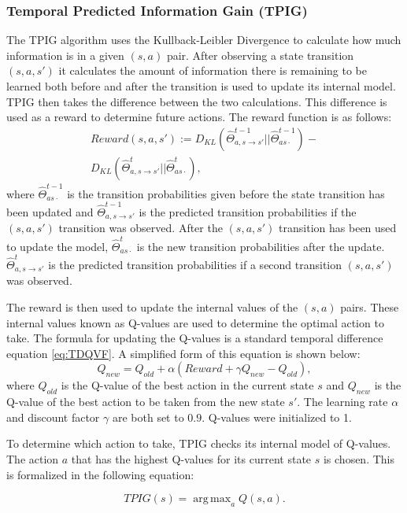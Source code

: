 \documentclass[letterpaper]{article} %
\DeclareMathOperator*{\argmax}{arg\,max}
\begin{document}
\subsubsection{Temporal Predicted Information Gain (TPIG)}
The TPIG algorithm uses the Kullback-Leibler Divergence to calculate how much information is in a given $(s,a)$ pair. After observing a state transition $(s,a,s')$ it calculates the amount of information there is remaining to be learned both before and after the transition is used to update its internal model. TPIG then takes the difference between the two calculations. This difference is used as a reward to determine future actions. The reward function is as follows:
\begin{multline}
	Reward(s,a,s') := D_{KL}(\hat{\Theta}_{a,s \rightarrow s'}^{t-1} || \hat{\Theta}_{as\cdot}^{t-1}) - \\ D_{KL}(\hat{\Theta}_{a,s \rightarrow s'}^{t} || \hat{\Theta}_{as\cdot}^{t}),
\label{eq:TPIGReward}
\end{multline}
where $\hat{\Theta}_{as\cdot}^{t-1}$ is the transition probabilities given before the state transition has been updated and $\hat{\Theta}_{a,s \rightarrow s'}^{t-1}$ is the predicted transition probabilities if the $(s,a,s')$ transition was observed. After the $(s,a,s')$ transition has been used to update the model, $\hat{\Theta}_{as\cdot}^{t}$ is the new transition probabilities after the update. $\hat{\Theta}_{a,s \rightarrow s'}^{t}$ is the predicted transition probabilities if a second transition $(s,a,s')$ was observed.

The reward is then used to update the internal values of the $(s,a)$ pairs. These internal values known as Q-values are used to determine the optimal action to take.
The formula for updating the Q-values is a standard temporal difference equation \eqref{eq:TDQVF}. A simplified form of this equation is shown below:
\[Q_{new} = Q_{old} + \alpha(Reward + \gamma Q_{new} - Q_{old}),\]
where $Q_{old}$ is the Q-value of the best action in the current state $s$ and $Q_{new}$ is the Q-value of the best action to be taken from the new state $s'$. The learning rate $\alpha$ and discount factor $\gamma$ are both set to $0.9$. Q-values were initialized to 1.

To determine which action to take, TPIG checks its internal model of Q-values. The action $a$ that has the highest Q-values for its current state $s$ is chosen. This is formalized in the following equation:

\[ TPIG(s) = \argmax_a  Q(s,a).\]
\end{document}
